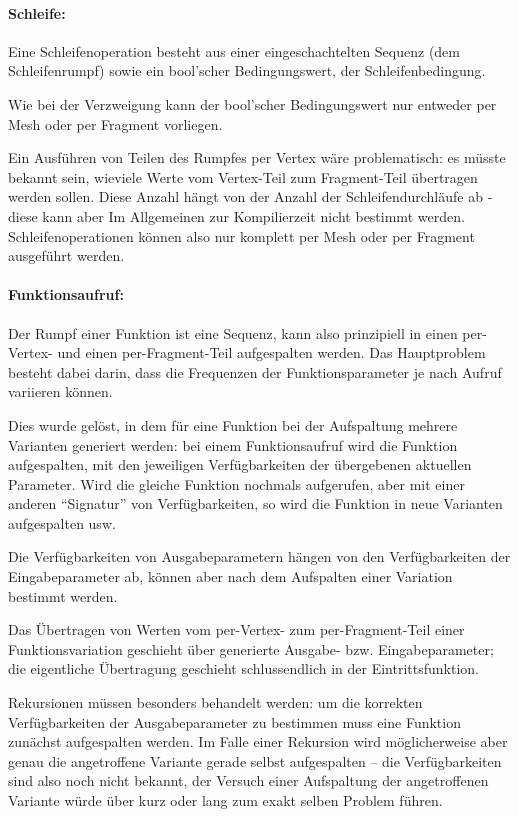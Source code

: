 \documentclass[twoside,a4paper,fleqn,12pt]{article}
\begin{document}
\paragraph{Schleife:} Eine Schleifenoperation besteht aus einer eingeschachtelten Sequenz (dem Schleifenrumpf) sowie
ein bool'scher Bedingungswert, der Schleifenbedingung.

Wie bei der Verzweigung kann der bool'scher Bedingungswert nur entweder per Mesh oder per Fragment vorliegen.

Ein Ausführen von Teilen des Rumpfes per Vertex wäre problematisch: es müsste bekannt sein, wieviele Werte vom Vertex-Teil
zum Fragment-Teil übertragen werden sollen. Diese Anzahl hängt von der Anzahl der Schleifendurchläufe ab -
diese kann aber Im Allgemeinen zur Kompilierzeit nicht bestimmt werden. Schleifenoperationen können also nur komplett
per Mesh oder per Fragment ausgeführt werden.

\paragraph{Funktionsaufruf:} Der Rumpf einer Funktion ist eine Sequenz, kann also prinzipiell in einen per-Vertex- und einen per-Fragment-Teil aufgespalten werden.
Das Hauptproblem besteht dabei darin, dass die Frequenzen der Funktionsparameter je nach Aufruf variieren können.

Dies wurde gelöst, in dem für eine Funktion bei der Aufspaltung mehrere Varianten generiert werden: bei einem Funktionsaufruf
wird die Funktion aufgespalten, mit den jeweiligen Verfügbarkeiten der übergebenen aktuellen Parameter. Wird die gleiche Funktion
nochmals aufgerufen, aber mit einer anderen "`Signatur"' von Verfügbarkeiten, so wird die Funktion in neue Varianten aufgespalten usw.

Die Verfügbarkeiten von Ausgabeparametern hängen von den Verfügbarkeiten der Eingabeparameter ab, können aber nach dem Aufspalten
einer Variation bestimmt werden.

Das Übertragen von Werten vom per-Vertex- zum per-Fragment-Teil einer Funktionsvariation geschieht über generierte Ausgabe- bzw.
Eingabeparameter; die eigentliche Übertragung geschieht schlussendlich in der Eintrittsfunktion.

Rekursionen müssen besonders behandelt werden: um die korrekten Verfügbarkeiten der Ausgabeparameter zu bestimmen
muss eine Funktion zunächst aufgespalten werden. Im Falle einer Rekursion wird möglicherweise aber genau die angetroffene
Variante gerade selbst aufgespalten -- die Verfügbarkeiten sind also noch nicht bekannt, der Versuch einer Aufspaltung der
angetroffenen Variante würde über kurz oder lang zum exakt selben Problem führen.
\end{document}
